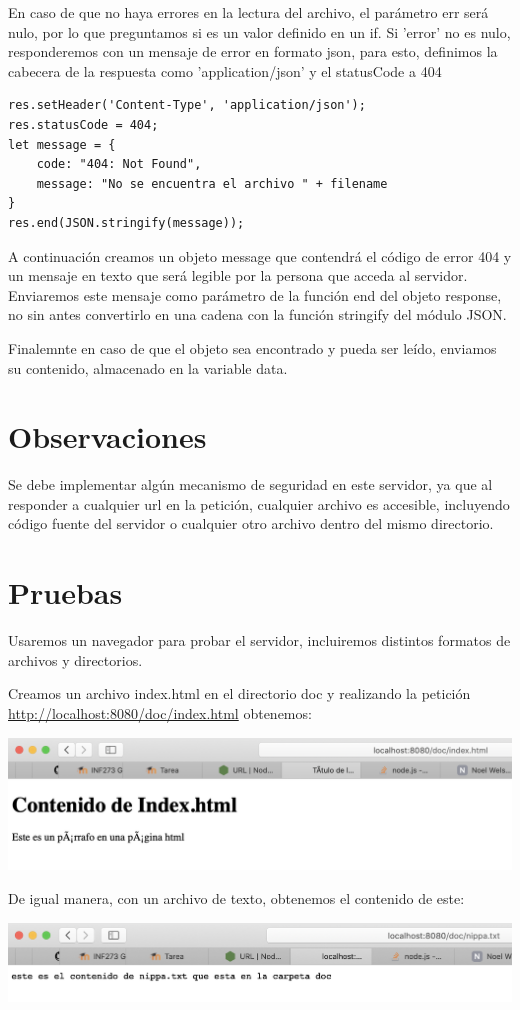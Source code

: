 \documentclass[11pt]{article}
\begin{document}
En caso de que no haya errores en la lectura del archivo, el parámetro err será nulo,
por lo que preguntamos si es un valor definido en un if.
Si 'error' no es nulo, responderemos con un mensaje de error en formato json,
para esto, definimos la cabecera de la respuesta como 'application/json' y
el statusCode a 404

\begin{verbatim}
res.setHeader('Content-Type', 'application/json');
res.statusCode = 404;
let message = {
    code: "404: Not Found",
    message: "No se encuentra el archivo " + filename
}
res.end(JSON.stringify(message));
\end{verbatim}

A continuación creamos un objeto message que contendrá el código de error 404
y un mensaje en texto que será legible por la persona que acceda al servidor.
Enviaremos este mensaje como parámetro de la función end del objeto response,
no sin antes convertirlo en una cadena con la función stringify del módulo JSON.

Finalemnte en caso de que el objeto sea encontrado y pueda ser leído,
enviamos su contenido, almacenado en la variable data.

\section{Observaciones}
\label{sec:orgcb4a948}
Se debe implementar algún mecanismo de seguridad en este servidor, ya que al responder a cualquier url en la petición,
cualquier archivo es accesible, incluyendo código fuente del servidor o cualquier otro archivo dentro
del mismo directorio.

\section{Pruebas}
\label{sec:orgbe22abf}
Usaremos un navegador para probar el servidor, incluiremos distintos formatos de archivos y directorios.

Creamos un archivo index.html en el directorio doc y realizando la petición \url{http://localhost:8080/doc/index.html} obtenemos:

\begin{center}
\includegraphics[width=.9\linewidth]{./captura.png}
\end{center}

De igual manera, con un archivo de texto, obtenemos el contenido de este:
\begin{center}
\includegraphics[width=.9\linewidth]{./captura2.png}
\end{center}
\end{document}
